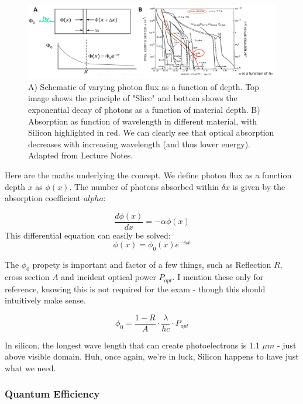 \begin{figure}[H]
    \centering
    \includegraphics[width=1\linewidth]{../../Figures/Optical_Absorbtion.PNG}
    \caption{A) Schematic of varying photon flux as a function of depth. Top image shows the principle of "Slice" and bottom shows the exponential decay of photons as a function of material depth. B) Absorption as function of wavelength in different material, with Silicon highlighted in red. We can clearly see that optical absorption decreases with increasing wavelength (and thus lower energy). Adapted from Lecture Notes.}
    \label{fig:Optical_Absorbtion}
\end{figure}

Here are the maths underlying the concept. We define photon flux as a function depth $x$ as $\phi(x)$. 
The number of photons absorbed within $\delta x$ is given by the absorption coefficient $alpha$:

\begin{equation}
    \frac{d\phi(x)}{dx} = -\alpha \phi(x)
\end{equation}
This differential equation can easily be solved:
\begin{equation}
    \phi(x) =  \phi_0(x) e^{-\alpha x} 
\end{equation}

The $\phi_0$ propety is important and factor of a few things, such as Reflection $R$, cross section $A$ and incident optical power $P_{opt}$. I mention these only for reference, knowing this is not required for the exam - though this should intuitively make sense. 

\begin{equation}
    \phi_0 = \frac{1-R}{A}\cdot \frac{\lambda}{hc}\cdot P_{opt}
\end{equation}

In silicon, the longest wave length that can create photoelectrons is 1.1 $\mu m$ - just above visible domain. Huh, once again, we're in luck, Silicon happens to have just what we need. 


\subsubsection{Quantum Efficiency}

